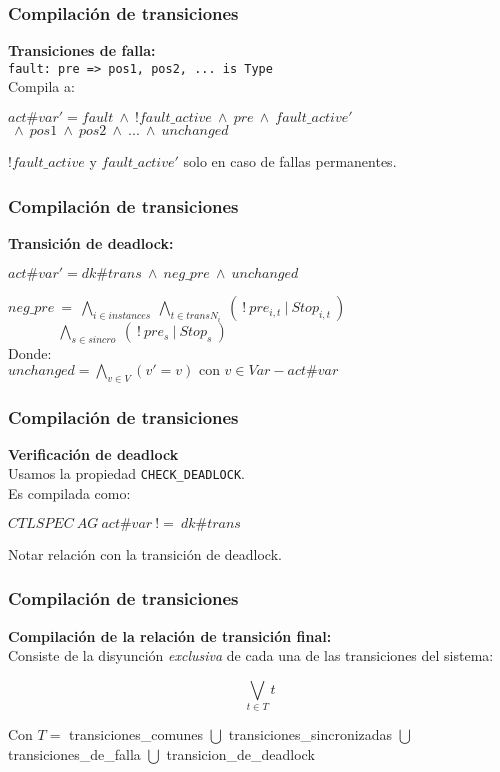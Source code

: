 \documentclass[serif]{beamer}
\begin{document}
\begin{frame}
\frametitle{Compilación de transiciones}
\textbf{\Large Transiciones de falla:}\\[0.3cm]
\texttt{fault: pre => pos1, pos2, ... is Type}\\[0.3cm]
Compila a:
\begin{framed}
$act\#var' = fault~\wedge~!fault\_active~\wedge~pre~\wedge~fault\_active'$
$~\wedge~pos1~\wedge~pos2~\wedge~...~\wedge~unchanged$
\end{framed}
$!fault\_active$ y $fault\_active'$ solo en caso de fallas permanentes.
\end{frame}


\begin{frame}
\frametitle{Compilación de transiciones}
\textbf{\Large Transición de deadlock:}\\[0.3cm]
\begin{framed}
$act\#var' = dk\#trans~\wedge~neg\_pre~\wedge~unchanged$
\end{framed}
$neg\_pre~=~\bigwedge_{i \in instances}~\bigwedge_{t \in transN_i}~(~!~pre_{i,t}~|~Stop_{i,t}~)$\\[0.3cm]
$~~~~~~~~~~~~~~~~\bigwedge_{s \in sincro}~(~!~pre_s~|~Stop_s~)$\\[0.3cm]
Donde:\\[0.3cm]
$unchanged = \bigwedge_{v \in V}(v' = v) \text{ con } v \in Var - act\#var$
\end{frame}

\begin{frame}
\frametitle{Compilación de transiciones}
\textbf{\Large Verificación de deadlock}\\[0.3cm]
Usamos la propiedad \texttt{CHECK\_DEADLOCK}.\\[0.3cm]
Es compilada como:
\begin{framed}
$CTLSPEC~AG~act\#var~!=~dk\#trans$
\end{framed}
Notar relación con la transición de deadlock.
\end{frame}



\begin{frame}
\frametitle{Compilación de transiciones}
\textbf{\Large Compilación de la relación de transición final:}\\[0.3cm]
Consiste de la disyunción \textit{exclusiva} de cada una de las 
transiciones del sistema:
\begin{framed}
$$\bigvee_{t \in T} t $$
\end{framed}
Con $T =$ transiciones\_comunes $\bigcup$ transiciones\_sincronizadas 
$\bigcup$ transiciones\_de\_falla $\bigcup$ transicion\_de\_deadlock
\end{frame}
\end{document}
